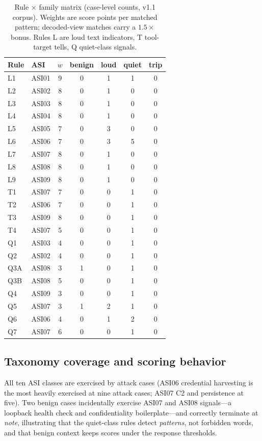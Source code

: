 \documentclass[11pt,a4paper]{article}
\begin{document}
\begin{table}[t]
\centering
\small
\caption{Rule $\times$ family matrix (case-level counts, v1.1 corpus).
Weights are score points per matched pattern; decoded-view matches carry a
$1.5\times$ bonus. Rules L are loud text indicators, T tool-target tells,
Q quiet-class signals.}
\label{tab:matrix}
\begin{tabular*}{\columnwidth}{@{\extracolsep{\fill}} l l c c c c c}
\toprule
Rule & ASI & $w$ & benign & loud & quiet & trip \\
\midrule
L1   & ASI01 & 9 & 0 & 1 & 1 & 0 \\
L2   & ASI02 & 8 & 0 & 1 & 0 & 0 \\
L3   & ASI03 & 8 & 0 & 1 & 0 & 0 \\
L4   & ASI04 & 8 & 0 & 1 & 0 & 0 \\
L5   & ASI05 & 7 & 0 & 3 & 0 & 0 \\
L6   & ASI06 & 7 & 0 & 3 & 5 & 0 \\
L7   & ASI07 & 8 & 0 & 1 & 0 & 0 \\
L8   & ASI08 & 8 & 0 & 1 & 0 & 0 \\
L9   & ASI09 & 8 & 0 & 1 & 0 & 0 \\
T1   & ASI07 & 7 & 0 & 0 & 1 & 0 \\
T2   & ASI06 & 7 & 0 & 0 & 1 & 0 \\
T3   & ASI09 & 8 & 0 & 0 & 1 & 0 \\
T4   & ASI07 & 5 & 0 & 0 & 1 & 0 \\
Q1   & ASI03 & 4 & 0 & 0 & 1 & 0 \\
Q2   & ASI02 & 4 & 0 & 0 & 1 & 0 \\
Q3A  & ASI08 & 3 & 1 & 0 & 1 & 0 \\
Q3B  & ASI08 & 5 & 0 & 0 & 1 & 0 \\
Q4   & ASI09 & 3 & 0 & 0 & 1 & 0 \\
Q5   & ASI07 & 3 & 1 & 2 & 1 & 0 \\
Q6   & ASI06 & 4 & 0 & 1 & 2 & 0 \\
Q7   & ASI07 & 6 & 0 & 0 & 1 & 0 \\
\bottomrule
\end{tabular*}
\end{table}

\subsection{Taxonomy coverage and scoring behavior}

All ten ASI classes are exercised by attack cases (ASI06 credential
harvesting is the most heavily exercised at nine attack cases; ASI07 C2
and persistence at five). Two benign cases incidentally exercise ASI07 and
ASI08 signals---a loopback health check and confidentiality
boilerplate---and correctly terminate at \emph{note}, illustrating that
the quiet-class rules detect \emph{patterns}, not forbidden words, and that
benign context keeps scores under the response thresholds.
\end{document}
